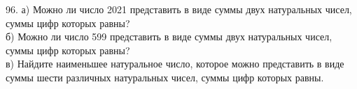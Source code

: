 96. а) Можно ли число 2021 представить в виде суммы двух натуральных чисел, суммы цифр которых равны?\\
б) Можно ли число 599 представить в виде суммы двух натуральных чисел, суммы цифр которых равны?\\
в) Найдите наименьшее натуральное число, которое можно представить в виде суммы шести различных натуральных чисел, суммы цифр которых равны.\\
